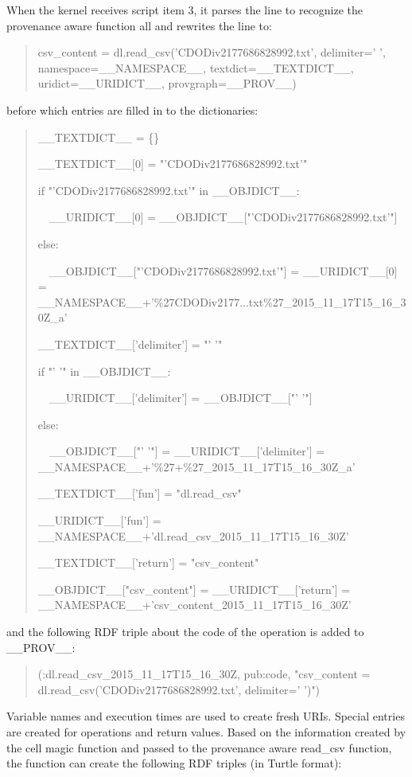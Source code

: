 When the kernel receives script item 3, it parses the line to recognize the provenance aware function all and rewrites the line to:
\begin{quotation}
	\noindent csv\_content = dl.read\_csv('CDODiv2177686828992.txt', delimiter=' ', namespace=\_\_NAMESPACE\_\_, textdict=\_\_TEXTDICT\_\_, uridict=\_\_URIDICT\_\_, provgraph=\_\_PROV\_\_)
\end{quotation}
before which entries are filled in to the dictionaries:
\begin{quotation}
	\noindent \_\_TEXTDICT\_\_ = \{\}
	
	\noindent \_\_TEXTDICT\_\_[0] = "'CDODiv2177686828992.txt'"
	
	\noindent if "'CDODiv2177686828992.txt'" in \_\_OBJDICT\_\_:
	
	\noindent \ \ \_\_URIDICT\_\_[0] = \_\_OBJDICT\_\_["'CDODiv2177686828992.txt'"]
	
	\noindent else:
	
	\noindent \ \ \_\_OBJDICT\_\_["'CDODiv2177686828992.txt'"] = \_\_URIDICT\_\_[0] = \_\_NAMESPACE\_\_+'\%27CDODiv2177...txt\%27\_2015\_11\_17T15\_16\_30Z\_a'
	
	\noindent \_\_TEXTDICT\_\_['delimiter'] = "' '"
	
	\noindent if "' '" in \_\_OBJDICT\_\_:
	
	\noindent \ \ \_\_URIDICT\_\_['delimiter'] = \_\_OBJDICT\_\_["' '"]
	
	\noindent else:
	
	\noindent \ \ \_\_OBJDICT\_\_["' '"] = \_\_URIDICT\_\_['delimiter'] = \_\_NAMESPACE\_\_+'\%27+\%27\_2015\_11\_17T15\_16\_30Z\_a'
	
	\noindent \_\_TEXTDICT\_\_['fun'] = "dl.read\_csv"
	
	\noindent \_\_URIDICT\_\_['fun'] = \_\_NAMESPACE\_\_+'dl.read\_csv\_2015\_11\_17T15\_16\_30Z'
	
	\noindent \_\_TEXTDICT\_\_['return'] = "csv\_content"
	
	\noindent \_\_OBJDICT\_\_["csv\_content"] = \_\_URIDICT\_\_['return'] = \_\_NAMESPACE\_\_+'csv\_content\_2015\_11\_17T15\_16\_30Z'
\end{quotation}
and the following RDF triple about the code of the operation is added to \_\_PROV\_\_:
\begin{quotation}
	\noindent (:dl.read\_csv\_2015\_11\_17T15\_16\_30Z, pub:code, "csv\_content = dl.read\_csv('CDODiv2177686828992.txt', delimiter=' ')")
\end{quotation} 
Variable names and execution times are used to create fresh URIs. Special entries are created for operations and return values. Based on the information created by the cell magic function and passed to the provenance aware read\_csv function, the function can create the following RDF triples (in Turtle format):
